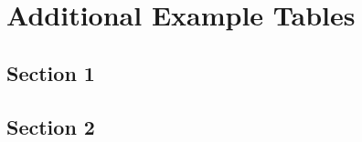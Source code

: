 \chapter{Additional Example Tables}\label{app:exampletables}
  \section{Section 1}\label{sec:A2section1}
    \lipsum[34-36]
  \section{Section 2}\label{sec:A2section2}
    \lipsum[38]
